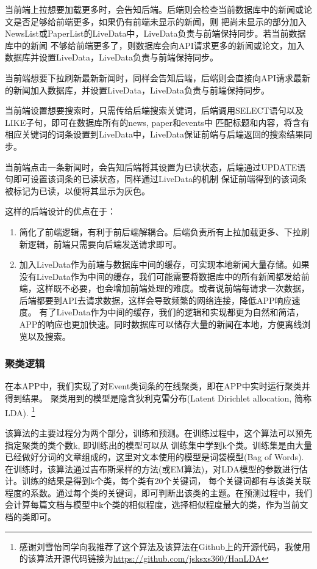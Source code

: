 \documentclass[UTF8]{article}
\begin{document}
当前端上拉想要加载更多时，会告知后端。后端则会检查当前数据库中的新闻或论文是否足够给前端更多，如果仍有前端未显示的新闻，则
把尚未显示的部分加入NewsList或PaperList的LiveData中，LiveData负责与前端保持同步。若当前数据库中的新闻
不够给前端更多了，则数据库会向API请求更多的新闻或论文，加入数据库并设置LiveData，LiveData负责与前端保持同步。

当前端想要下拉刷新最新新闻时，同样会告知后端，后端则会直接向API请求最新的新闻加入数据库，并设置LiveData，LiveData负责与前端保持同步。

当前端设置想要搜索时，只需传给后端搜索关键词，后端调用SELECT语句以及LIKE子句，即可在数据库所有的news, paper和events中
匹配标题和内容，将含有相应关键词的词条设置到LiveData中，LiveData保证前端与后端返回的搜索结果同步。

当前端点击一条新闻时，会告知后端将其设置为已读状态，后端通过UPDATE语句即可设置该词条的已读状态，同样通过LiveData的机制
保证前端得到的该词条被标记为已读，以便将其显示为灰色。

这样的后端设计的优点在于：
\begin{enumerate}
    \item 简化了前端逻辑，有利于前后端解耦合。后端负责所有上拉加载更多、下拉刷新逻辑，前端只需要向后端发送请求即可。
    \item 加入LiveData作为前端与数据库中间的缓存，可实现本地新闻大量存储。如果没有LiveData作为中间的缓存，我们可能需要将数据库中的所有新闻都发给前端，这样既不必要，也会增加前端处理的难度。或者说前端每请求一次数据，后端都要到API去请求数据，这样会导致频繁的网络连接，降低APP响应速度。
            有了LiveData作为中间的缓存，我们的逻辑和实现都更为自然和简洁，APP的响应也更加快速。同时数据库可以储存大量的新闻在本地，方便离线浏览以及搜索。

\end{enumerate}

\newpage

\subsubsection{聚类逻辑}
在本APP中，我们实现了对Event类词条的在线聚类，即在APP中实时运行聚类并得到结果。
聚类用到的模型是隐含狄利克雷分布(Latent Dirichlet allocation, 简称LDA).
\footnote{感谢刘雪怡同学向我推荐了这个算法及该算法在Github上的开源代码，我使用的该算法开源代码链接为\url{https://github.com/jsksxs360/HanLDA}}

该算法的主要过程分为两个部分，训练和预测。在训练过程中，这个算法可以预先指定聚类的类个数k, 即训练出的模型可以从
训练集中学到k个类。训练集是由大量已经做好分词的文章组成的，这里对文本使用的模型是词袋模型(Bag of Words).
在训练时，该算法通过吉布斯采样的方法(或EM算法)，对LDA模型的参数进行估计。训练的结果是得到k个类，每个类有20个关键词，
每个关键词都有与该类关联程度的系数。通过每个类的关键词，即可判断出该类的主题。在预测过程中，我们会计算每篇文档与模型中k个类的相似程度，选择相似程度最大的类，作为当前文档的类即可。
\end{document}
